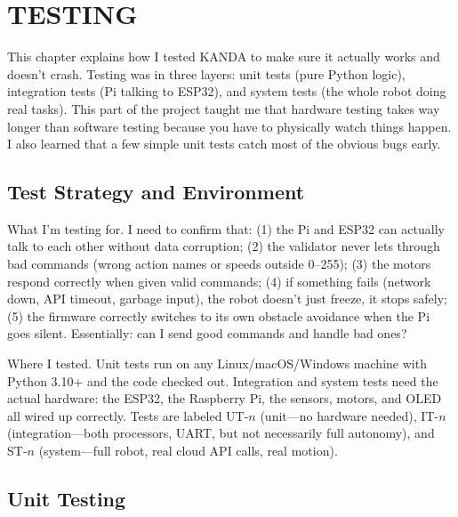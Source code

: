 \chapter{TESTING}
\label{ch:testing}

This chapter explains how I tested KANDA to make sure it actually works and doesn't crash. Testing was in three layers: unit tests (pure Python logic), integration tests (Pi talking to ESP32), and system tests (the whole robot doing real tasks). This part of the project taught me that hardware testing takes way longer than software testing because you have to physically watch things happen. I also learned that a few simple unit tests catch most of the obvious bugs early.


\section{Test Strategy and Environment}
\label{sec:test_strategy}

What I'm testing for. I need to confirm that: (1) the Pi and ESP32 can actually talk to each other without data corruption; (2) the validator never lets through bad commands (wrong action names or speeds outside 0--255); (3) the motors respond correctly when given valid commands; (4) if something fails (network down, API timeout, garbage input), the robot doesn't just freeze, it stops safely; (5) the firmware correctly switches to its own obstacle avoidance when the Pi goes silent. Essentially: can I send good commands and handle bad ones?

Where I tested. Unit tests run on any Linux/macOS/Windows machine with Python 3.10+ and the code checked out. Integration and system tests need the actual hardware: the ESP32, the Raspberry Pi, the sensors, motors, and OLED all wired up correctly. Tests are labeled UT-$n$ (unit—no hardware needed), IT-$n$ (integration—both processors, UART, but not necessarily full autonomy), and ST-$n$ (system—full robot, real cloud API calls, real motion).


\section{Unit Testing}
\label{sec:unit_testing}


